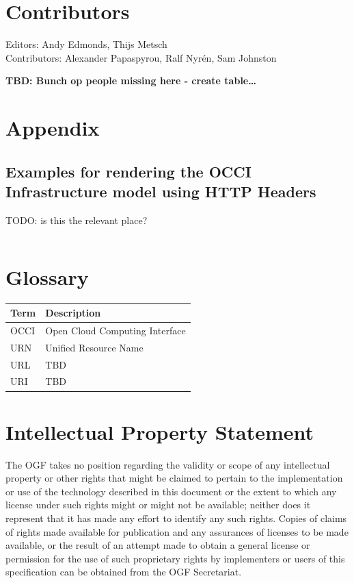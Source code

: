 \documentclass[10pt,a4paper]{article}
\begin{document}
\section{Contributors}

Editors: Andy Edmonds, Thijs Metsch \\
Contributors: Alexander Papaspyrou, Ralf Nyr\'en, Sam Johnston

\textbf{TBD: Bunch op people missing here - create table\ldots}

\section{Appendix}

\subsection{Examples for rendering the OCCI Infrastructure model using HTTP Headers}
TODO: is this the relevant place?

\begin{verbatim}

\end{verbatim}

\section{Glossary}

\begin{tabular}{l|l}
Term & Description \\
\hline
OCCI & Open Cloud Computing Interface \\
URN & Unified Resource Name \\
URL & TBD \\
URI & TBD \\
\end{tabular}

\section{Intellectual Property Statement}

The OGF takes no position regarding the validity or scope of any intellectual property or other rights that might be claimed to pertain to the implementation or use of the technology described in this document or the extent to which any license under such rights might or might not be available; neither does it represent that it has made any effort to identify any such rights. Copies of claims of rights made available for publication and any assurances of licenses to be made available, or the result of an attempt made to obtain a general license or permission for the use of such proprietary rights by implementers or users of this specification can be obtained from the OGF Secretariat.
\end{document}
